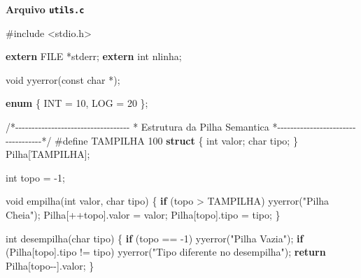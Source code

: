 \documentclass[
  brazilian,
  letterpaper,
]{book}
\newenvironment{Shaded}{\begin{snugshade}}{\end{snugshade}}
\newcommand{\CommentTok}[1]{\textcolor[rgb]{0.37,0.37,0.37}{#1}}
\newcommand{\ControlFlowTok}[1]{\textcolor[rgb]{0.00,0.23,0.31}{\textbf{#1}}}
\newcommand{\DataTypeTok}[1]{\textcolor[rgb]{0.68,0.00,0.00}{#1}}
\newcommand{\DecValTok}[1]{\textcolor[rgb]{0.68,0.00,0.00}{#1}}
\newcommand{\ImportTok}[1]{\textcolor[rgb]{0.00,0.46,0.62}{#1}}
\newcommand{\KeywordTok}[1]{\textcolor[rgb]{0.00,0.23,0.31}{\textbf{#1}}}
\newcommand{\NormalTok}[1]{\textcolor[rgb]{0.00,0.23,0.31}{#1}}
\newcommand{\OperatorTok}[1]{\textcolor[rgb]{0.37,0.37,0.37}{#1}}
\newcommand{\PreprocessorTok}[1]{\textcolor[rgb]{0.68,0.00,0.00}{#1}}
\newcommand{\StringTok}[1]{\textcolor[rgb]{0.13,0.47,0.30}{#1}}
\theoremstyle{plain}
\theoremstyle{definition}
\theoremstyle{remark}
\begin{document}
\textbf{Arquivo \texttt{utils.c}}

\begin{Shaded}
\begin{Highlighting}[]
\PreprocessorTok{\#include }\ImportTok{\textless{}stdio.h\textgreater{}}

\KeywordTok{extern} \DataTypeTok{FILE} \OperatorTok{*}\NormalTok{stderr}\OperatorTok{;}
\KeywordTok{extern} \DataTypeTok{int}\NormalTok{ nlinha}\OperatorTok{;}

\DataTypeTok{void}\NormalTok{ yyerror}\OperatorTok{(}\DataTypeTok{const} \DataTypeTok{char} \OperatorTok{*);}

\KeywordTok{enum}
\OperatorTok{\{}
\NormalTok{    INT }\OperatorTok{=} \DecValTok{10}\OperatorTok{,}
\NormalTok{    LOG }\OperatorTok{=} \DecValTok{20}
\OperatorTok{\};}

\CommentTok{/*{-}{-}{-}{-}{-}{-}{-}{-}{-}{-}{-}{-}{-}{-}{-}{-}{-}{-}{-}{-}{-}{-}{-}{-}{-}{-}{-}{-}{-}{-}{-}{-}{-}{-}{-}}
\CommentTok{ * Estrutura da Pilha Semantica}
\CommentTok{ *{-}{-}{-}{-}{-}{-}{-}{-}{-}{-}{-}{-}{-}{-}{-}{-}{-}{-}{-}{-}{-}{-}{-}{-}{-}{-}{-}{-}{-}{-}{-}{-}{-}{-}{-}*/}
\PreprocessorTok{\#define TAMPILHA }\DecValTok{100}
\KeywordTok{struct}
\OperatorTok{\{}
    \DataTypeTok{int}\NormalTok{ valor}\OperatorTok{;}
    \DataTypeTok{char}\NormalTok{ tipo}\OperatorTok{;}
\OperatorTok{\}}\NormalTok{ Pilha}\OperatorTok{[}\NormalTok{TAMPILHA}\OperatorTok{];}

\DataTypeTok{int}\NormalTok{ topo }\OperatorTok{=} \OperatorTok{{-}}\DecValTok{1}\OperatorTok{;}

\DataTypeTok{void}\NormalTok{ empilha}\OperatorTok{(}\DataTypeTok{int}\NormalTok{ valor}\OperatorTok{,} \DataTypeTok{char}\NormalTok{ tipo}\OperatorTok{)}
\OperatorTok{\{}
    \ControlFlowTok{if} \OperatorTok{(}\NormalTok{topo }\OperatorTok{\textgreater{}}\NormalTok{ TAMPILHA}\OperatorTok{)}
\NormalTok{        yyerror}\OperatorTok{(}\StringTok{"Pilha Cheia"}\OperatorTok{);}
\NormalTok{    Pilha}\OperatorTok{[++}\NormalTok{topo}\OperatorTok{].}\NormalTok{valor }\OperatorTok{=}\NormalTok{ valor}\OperatorTok{;}
\NormalTok{    Pilha}\OperatorTok{[}\NormalTok{topo}\OperatorTok{].}\NormalTok{tipo }\OperatorTok{=}\NormalTok{ tipo}\OperatorTok{;}
\OperatorTok{\}}

\DataTypeTok{int}\NormalTok{ desempilha}\OperatorTok{(}\DataTypeTok{char}\NormalTok{ tipo}\OperatorTok{)}
\OperatorTok{\{}
    \ControlFlowTok{if} \OperatorTok{(}\NormalTok{topo }\OperatorTok{==} \OperatorTok{{-}}\DecValTok{1}\OperatorTok{)}
\NormalTok{        yyerror}\OperatorTok{(}\StringTok{"Pilha Vazia"}\OperatorTok{);}
    \ControlFlowTok{if} \OperatorTok{(}\NormalTok{Pilha}\OperatorTok{[}\NormalTok{topo}\OperatorTok{].}\NormalTok{tipo }\OperatorTok{!=}\NormalTok{ tipo}\OperatorTok{)}
\NormalTok{        yyerror}\OperatorTok{(}\StringTok{"Tipo diferente no desempilha"}\OperatorTok{);}
    \ControlFlowTok{return}\NormalTok{ Pilha}\OperatorTok{[}\NormalTok{topo}\OperatorTok{{-}{-}].}\NormalTok{valor}\OperatorTok{;}
\OperatorTok{\}}


\end{Highlighting}
\end{Shaded}
\end{document}
